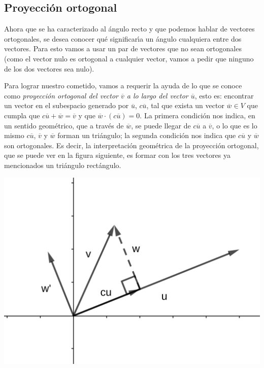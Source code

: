 \documentclass[a4paper,11pt]{article}
\theoremstyle{teoremas}
\theoremstyle{ejemplos}
\theoremstyle{definiciones}
\theoremstyle{lemas}
\begin{document}
\subsection{Proyecci\'on ortogonal}

Ahora que se ha caracterizado al \'angulo recto y que podemos hablar de vectores ortogonales, se desea conocer qu\'e significar\'{\i}a un \'angulo cualquiera entre dos vectores. Para esto vamos a usar un par de vectores que no sean ortogonales (como el vector nulo es ortogonal a cualquier vector, vamos a pedir que ninguno de los dos vectores sea nulo).
\par 
Para lograr nuestro cometido, vamos a requerir la ayuda de lo que se conoce como \textit{proyecci\'on ortogonal del vector $\overline{v}$ a lo largo del vector $\overline{u}$}, esto es: encontrar un vector en el subespacio generado por $\overline{u}$, $c\overline{u}$, tal que exista un vector $\overline{w} \in V$ que cumpla que $c\overline{u} + \overline{w} = \overline{v}$ y que $\overline{w}\cdot \left( c\overline{u} \right) = 0$. La primera condici\'on nos indica, en un sentido geom\'etrico, que a trav\'es de $\overline{w}$, se puede llegar de $c\overline{u}$ a $\overline{v}$, o lo que es lo mismo $c\overline{u}$, $\overline{v}$ y $\overline{w}$ forman un tri\'angulo; la segunda condici\'on nos indica que $c\overline{u}$ y $\overline{w}$ son ortogonales. Es decir, la interpretaci\'on geom\'etrica de la proyecci\'on ortogonal, que se puede ver en la figura siguiente, es formar con los tres vectores ya mencionados un tri\'angulo rect\'angulo. \begin{center}
 \includegraphics[scale=0.8]{apuntes_algebra_lineal_02.png}
\end{center}
\end{document}
